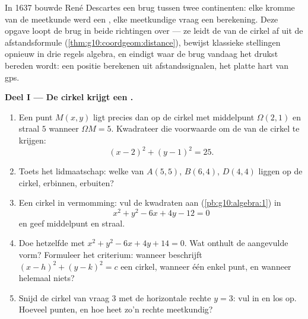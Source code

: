 \begin{problem}
\label{pb:g10:coordgeom:1}
In 1637 bouwde René Descartes een brug tussen twee continenten: elke kromme
van de meetkunde werd een \emph{}, elke meetkundige vraag een
berekening. Deze opgave loopt de brug in beide richtingen over --- ze leidt
de  van de cirkel af uit de afstandsformule
(\cref{thm:g10:coordgeom:distance}), bewijst klassieke stellingen opnieuw in
drie regels algebra, en eindigt waar de brug vandaag het drukst bereden wordt:
een positie berekenen uit afstandssignalen, het platte hart van gps.

\medskip
\noindent\textbf{Deel I --- De cirkel krijgt een .}
\begin{enumerate}
  \item Een punt $M(x, y)$ ligt precies dan op de cirkel met middelpunt
        $\Omega(2, 1)$ en straal $5$ wanneer $\Omega M = 5$. Kwadrateer die
        voorwaarde om de  van de cirkel te krijgen:
        \[
        (x - 2)^2 + (y - 1)^2 = 25 .
        \]
  \item Toets het lidmaatschap: welke van $A(5, 5)$, $B(6, 4)$, $D(4, 4)$
        liggen op de cirkel, erbinnen, erbuiten?
  \item Een cirkel in vermomming: vul de kwadraten aan
        (\cref{pb:g10:algebra:1}) in
        \[
        x^2 + y^2 - 6x + 4y - 12 = 0
        \]
        en geef middelpunt en straal.
  \item Doe hetzelfde met $x^2 + y^2 - 6x + 4y + 14 = 0$. Wat onthult de
        aangevulde vorm? Formuleer het criterium: wanneer beschrijft
        $(x - h)^2 + (y - k)^2 = c$ een cirkel, wanneer één enkel punt, en
        wanneer helemaal niets?
  \item Snijd de cirkel van vraag 3 met de horizontale rechte $y = 3$: vul
        in en los op. Hoeveel punten, en hoe heet zo'n rechte meetkundig?
\end{enumerate}


\end{problem}
